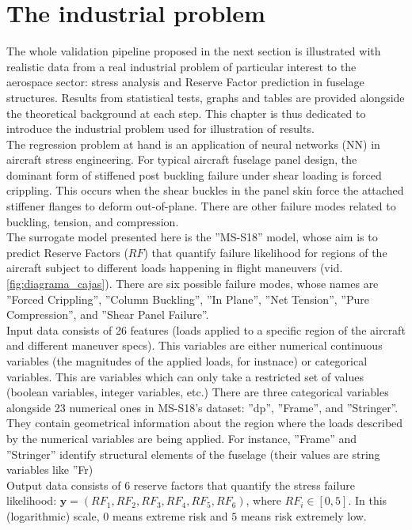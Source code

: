 \chapter{The industrial problem}\label{chap:2}
The whole validation pipeline proposed in the next section is illustrated with realistic data from a real industrial problem of particular interest to the aerospace sector: stress analysis and Reserve Factor prediction in fuselage structures. Results from statistical tests, graphs and tables are provided alongside the theoretical background at each step. This chapter is thus dedicated to introduce the industrial problem used for illustration of results.\\
%
\indent The regression problem at hand is an application of neural networks (NN) in aircraft stress engineering. For typical aircraft fuselage panel design, the dominant form of stiffened post buckling failure under shear loading is forced crippling\cite{bijlaard1955buckling}. This occurs when the shear buckles in the panel skin force the attached stiffener flanges to deform out-of-plane. There are other failure modes related to buckling, tension, and compression.\\
%
\indent The surrogate model presented here is the ''MS-S18'' model, whose aim is to predict Reserve Factors ($RF$) that quantify failure likelihood for regions of the aircraft subject to different loads happening in flight maneuvers (vid. \autoref{fig:diagrama_cajas}). There are six possible failure modes, whose names are ''Forced Crippling'', ''Column Buckling'', ''In Plane'', ''Net Tension'', ''Pure Compression'', and ''Shear Panel Failure''.\\
%
\indent Input data consists of 26 features (loads applied to a specific region of the aircraft and different maneuver specs). This variables are either numerical continuous variables (the magnitudes of the applied loads, for instnace) or categorical variables. This are variables which can only take a restricted set of values (\eg boolean variables, integer variables, etc.) There are three categorical variables alongside 23 numerical ones in MS-S18's dataset: ''dp'', ''Frame'', and ''Stringer''. They contain geometrical information about the region where the loads described by the numerical variables are being applied. For instance, ''Frame'' and ''Stringer'' identify structural elements of the fuselage (their values are string variables like ''Fr)\\
%
\indent Output data consists of 6 reserve factors that quantify the stress failure likelihood: $\mathbf{y}=(RF_1,RF_2,RF_3,RF_4,RF_5,RF_6)$, where $RF_i\in [0,5]$. In this (logarithmic) scale, $0$ means extreme risk and $5$ means risk extremely low.\\
